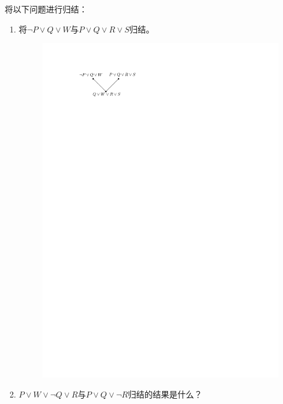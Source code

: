 \begin{example}
    将以下问题进行归结：
    \begin{enumerate}
        \item 将$\lnot P\lor Q\lor W$与$P\lor Q\lor R\lor S$归结。
        \begin{figure}[htbp]
            \centering
            \includegraphics{image/归结-1.pdf}
        \end{figure}
        \item $P\lor W\lor \lnot Q\lor R$与$P\lor Q\lor \lnot R$归结的结果是什么？
        \begin{figure}[htbp]
            \centering

\end{figure}
\end{enumerate}
\end{example}
